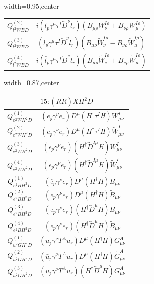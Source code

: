 \begin{table}[H]
\begin{center}
\begin{adjustbox}{width=0.95\textwidth,center}
\begin{minipage}[t]{7.4cm}
\begin{tabular}[t]{c|c}
%
$Q_{l^2WBD}^{(2)}$  &  $i (\bar l_p \gamma^\mu \tau^I \overleftrightarrow{D}^\nu l_r) (B_{\mu\rho} W_{\nu}^{I\rho} + B_{\nu\rho} W_{\mu}^{I\rho})$ \\
%
$Q_{l^2WBD}^{(3)}$  &  $(\bar l_p \gamma^\mu \tau^I \overleftrightarrow{D}^\nu l_r) (B_{\mu\rho}\widetilde{W}_\nu^{I \rho} - B_{\nu\rho} \widetilde W_\mu^{I \rho})$ \\
%
$Q_{l^2WBD}^{(4)}$  &  $i (\bar l_p \gamma^\mu \tau^I \overleftrightarrow{D}^\nu l_r) (B_{\mu\rho}\widetilde{W}_\nu^{I \rho} + B_{\nu\rho} \widetilde W_\mu^{I \rho})$ 
\end{tabular}
\end{minipage}
\end{adjustbox}
\begin{adjustbox}{width=0.87\textwidth,center}
\small
\begin{minipage}[t]{5.6cm}
\renewcommand{\arraystretch}{1.5}
\begin{tabular}[t]{c|c}
\multicolumn{2}{c}{\boldmath$15:(\bar R R)XH^2D$} \\
\hline
$Q_{e^2WH^2D}^{(1)}$  &  $(\bar{e}_p \gamma^\nu e_r) D^{\mu} (H^\dag \tau^I H) W_{\mu\nu}^I$ \\
%
$Q_{e^2WH^2D}^{(2)}$  &  $(\bar{e}_p \gamma^\nu e_r) D^{\mu} (H^\dag \tau^I H) \widetilde W_{\mu\nu}^I$ \\
%
$Q_{e^2WH^2D}^{(3)}$  &  $(\bar{e}_p \gamma^\nu e_r) (H^\dag \overleftrightarrow{D}^{I\mu} H) W_{\mu\nu}^I$ \\
%
$Q_{e^2WH^2D}^{(4)}$  &  $(\bar{e}_p \gamma^\nu e_r) (H^\dag \overleftrightarrow{D}^{I\mu} H) \widetilde W_{\mu\nu}^I$ \\
%
$Q_{e^2BH^2D}^{(1)}$  &  $(\bar{e}_p \gamma^\nu e_r) D^{\mu} (H^\dag H) B_{\mu\nu}$ \\
%
$Q_{e^2BH^2D}^{(2)}$  &  $(\bar{e}_p \gamma^\nu e_r) D^{\mu} (H^\dag H) \widetilde B_{\mu\nu}$ \\
%
$Q_{e^2BH^2D}^{(3)}$  &  $(\bar{e}_p \gamma^\nu e_r) (H^\dag \overleftrightarrow{D}^\mu H) B_{\mu\nu}$ \\
%
$Q_{e^2BH^2D}^{(4)}$  &  $(\bar{e}_p \gamma^\nu e_r) (H^\dag \overleftrightarrow{D}^\mu H) \widetilde B_{\mu\nu}$ \\
%
$Q_{u^2GH^2D}^{(1)}$  &  $(\bar{u}_p \gamma^\nu T^A u_r) D^{\mu} (H^\dag H) G_{\mu\nu}^A$ \\
%
$Q_{u^2GH^2D}^{(2)}$  &  $(\bar{u}_p \gamma^\nu T^A u_r) D^{\mu} (H^\dag H) \widetilde G_{\mu\nu}^A$ \\
%
$Q_{u^2GH^2D}^{(3)}$  &  $(\bar{u}_p \gamma^\nu T^A u_r) (H^\dag \overleftrightarrow{D}^\mu H) G_{\mu\nu}^A$ \\

\end{tabular}
\end{minipage}
\end{adjustbox}
\end{center}
\end{table}
